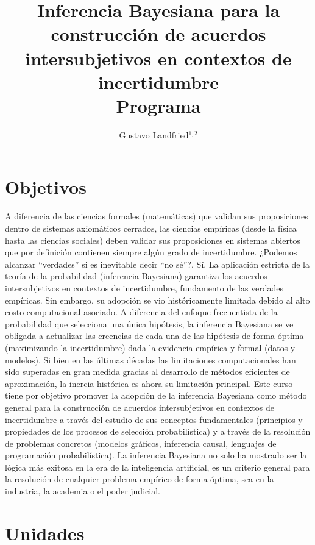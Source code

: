 \documentclass[10pt]{article}
\title{\huge Inferencia Bayesiana para la construcción de acuerdos intersubjetivos en contextos de incertidumbre  \\  \LARGE Programa}
\author{Gustavo Landfried$^{1,2}$}
\affil{\small 1. Bayes de las Provincias Unidas del Sur }
\affil{\vspace{-0.2cm}\small 2. Laboratorio Pacha Pampas}
\affil[]{Correspondencia: \url{bayesdelsur@gmail.com}}
\begin{document}
\maketitle

\section{Objetivos}

A diferencia de las ciencias formales (matemáticas) que validan sus proposiciones dentro de sistemas axiomáticos cerrados, las ciencias empíricas (desde la física hasta las ciencias sociales) deben validar sus proposiciones en sistemas abiertos que por definición contienen siempre algún grado de incertidumbre. ¿Podemos alcanzar “verdades” si es inevitable decir “no sé”?. Sí. La aplicación estricta de la teoría de la probabilidad (inferencia Bayesiana) garantiza los acuerdos intersubjetivos en contextos de incertidumbre, fundamento de las verdades empíricas. Sin embargo, su adopción se vio históricamente limitada debido al alto costo computacional asociado. A diferencia del enfoque frecuentista de la probabilidad que selecciona una única hipótesis, la inferencia Bayesiana se ve obligada a actualizar las creencias de cada una de las hipótesis de forma óptima (maximizando la incertidumbre) dada la evidencia empírica y formal (datos y modelos). Si bien en las últimas décadas las limitaciones computacionales han sido superadas en gran medida gracias al desarrollo de métodos eficientes de aproximación, la inercia histórica es ahora su limitación principal. Este curso tiene por objetivo promover la adopción de la inferencia Bayesiana como método general para la construcción de acuerdos intersubjetivos en contextos de incertidumbre a través del estudio de sus conceptos fundamentales (principios y propiedades de los procesos de selección probabilística) y a través de la resolución de problemas concretos (modelos gráficos, inferencia causal, lenguajes de programación probabilística). La inferencia Bayesiana no solo ha mostrado ser la lógica más exitosa en la era de la inteligencia artificial, es un criterio general para la resolución de cualquier problema empírico de forma óptima, sea en la industria, la academia o el poder judicial.

\section{Unidades}
\end{document}
